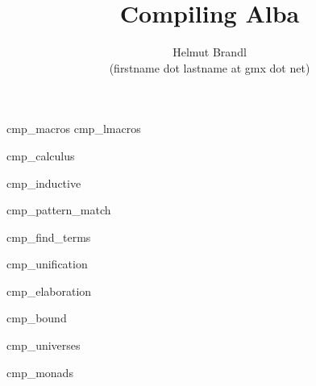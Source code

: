 \documentclass[10pt]{article}
\begin{document}


\title{
    Compiling Alba
}

\author{
    Helmut Brandl
    \\
    \scriptsize (firstname dot lastname at gmx dot net)
}
\date{}

\maketitle




\tableofcontents

 {cmp_macros}
 {cmp_lmacros}

\lstset{language=alba}

 {cmp_calculus}

 {cmp_inductive}

 {cmp_pattern_match}

 {cmp_find_terms}

 {cmp_unification}

 {cmp_elaboration}

 {cmp_bound}

 {cmp_universes}

 {cmp_monads}
\end{document}
